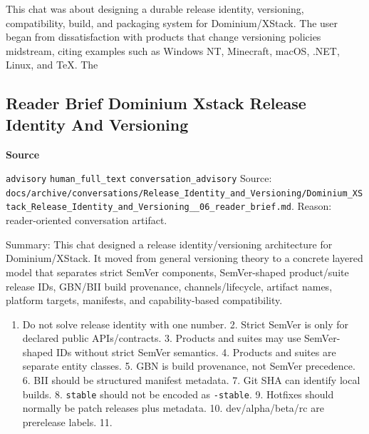 \documentclass[9pt,a4paper,openany]{book}
\newcommand{\vonecallout}[3]{\par\medskip\noindent\begingroup\setlength{\fboxsep}{7pt}\colorbox{DomCalloutBg}{\parbox{0.94\linewidth}{\textbf{\textcolor{#1}{#2}}\par #3}}\endgroup\par\medskip}
\begin{document}
This chat was about designing a durable release identity, versioning, compatibility, build, and packaging system for Dominium/\allowbreak{}XStack.\allowbreak{} The user began from dissatisfaction with products that change versioning policies midstream, citing examples such as Windows NT, Minecraft, macOS, .\allowbreak{}NET, Linux, and TeX.\allowbreak{} The



\subsection{Reader Brief Dominium Xstack Release Identity And Versioning}

\vonecallout{DomSlate}{Source}{\texttt{advisory} \texttt{human\_\allowbreak{}full\_\allowbreak{}text} \texttt{conversation\_\allowbreak{}advisory} Source: \texttt{docs/\allowbreak{}archive/\allowbreak{}conversations/\allowbreak{}Release\_\allowbreak{}Identity\_\allowbreak{}and\_\allowbreak{}Versioning/\allowbreak{}Dominium\_\allowbreak{}XStack\_\allowbreak{}Release\_\allowbreak{}Identity\_\allowbreak{}and\_\allowbreak{}Versioning\_\allowbreak{}\_\allowbreak{}06\_\allowbreak{}reader\_\allowbreak{}brief.\allowbreak{}md}.\allowbreak{} Reason: reader-\allowbreak{}oriented conversation artifact.\allowbreak{}}

Summary: This chat designed a release identity/\allowbreak{}versioning architecture for Dominium/\allowbreak{}XStack.\allowbreak{} It moved from general versioning theory to a concrete layered model that separates strict SemVer components, SemVer-\allowbreak{}shaped product/\allowbreak{}suite release IDs, GBN/\allowbreak{}BII build provenance, channels/\allowbreak{}lifecycle, artifact names, platform targets, manifests, and capability-\allowbreak{}based compatibility.\allowbreak{}


\begin{enumerate}
\item Do not solve release identity with one number.\allowbreak{} 2.\allowbreak{} Strict SemVer is only for declared public APIs/\allowbreak{}contracts.\allowbreak{} 3.\allowbreak{} Products and suites may use SemVer-\allowbreak{}shaped IDs without strict SemVer semantics.\allowbreak{} 4.\allowbreak{} Products and suites are separate entity classes.\allowbreak{} 5.\allowbreak{} GBN is build provenance, not SemVer precedence.\allowbreak{} 6.\allowbreak{} BII should be structured manifest metadata.\allowbreak{} 7.\allowbreak{} Git SHA can identify local builds.\allowbreak{} 8.\allowbreak{} \texttt{stable} should not be encoded as \texttt{-\allowbreak{}stable}.\allowbreak{} 9.\allowbreak{} Hotfixes should normally be patch releases plus metadata.\allowbreak{} 10.\allowbreak{} dev/\allowbreak{}alpha/\allowbreak{}beta/\allowbreak{}rc are prerelease labels.\allowbreak{} 11.\allowbreak{}
\end{enumerate}
\end{document}

